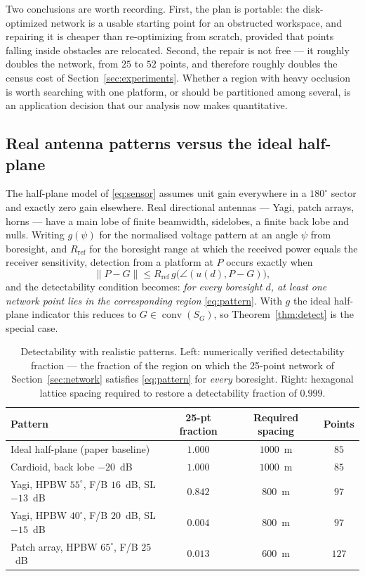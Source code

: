 \documentclass[preprint,12pt,3p]{elsarticle}
\theoremstyle{definition}
\newcommand{\conv}{\operatorname{conv}}
\begin{document}
Two conclusions are worth recording. First, the plan is portable: the disk-optimized network is a
usable starting point for an obstructed workspace, and repairing it is cheaper than re-optimizing
from scratch, provided that points falling inside obstacles are relocated. Second, the repair is
not free --- it roughly doubles the network, from $25$ to $52$ points, and therefore roughly
doubles the census cost of Section~\ref{sec:experiments}. Whether a region with heavy occlusion is
worth searching with one platform, or should be partitioned among several, is an application
decision that our analysis now makes quantitative.


\subsection{Real antenna patterns versus the ideal half-plane}
\label{sec:antenna}

The half-plane model of \eqref{eq:sensor} assumes unit gain everywhere in a $180^\circ$ sector and
exactly zero gain elsewhere. Real directional antennas --- Yagi, patch arrays, horns --- have a
main lobe of finite beamwidth, sidelobes, a finite back lobe and nulls. Writing $g(\psi)$ for the
normalised voltage pattern at an angle $\psi$ from boresight, and $R_{\mathrm{ref}}$ for the
boresight range at which the received power equals the receiver sensitivity, detection from a
platform at $P$ occurs exactly when
\begin{equation}
\|P-G\|\le R_{\mathrm{ref}}\,g\bigl(\angle(u(d),P-G)\bigr),
\label{eq:pattern}
\end{equation}
and the detectability condition becomes: \emph{for every boresight $d$, at least one network point
lies in the corresponding region} \eqref{eq:pattern}. With $g$ the ideal half-plane indicator this
reduces to $G\in\conv(S_G)$, so Theorem~\ref{thm:detect} is the special case.

\begin{table}[t]
\caption{Detectability with realistic patterns. Left: numerically verified detectability fraction
--- the fraction of the region on which the 25-point network of Section~\ref{sec:network}
satisfies \eqref{eq:pattern} for \emph{every} boresight. Right: hexagonal lattice spacing
required to restore a detectability fraction of $0.999$.}
\label{tab:antenna}
\centering
\small
\begin{tabular}{lccc}
\toprule
Pattern & 25-pt fraction & Required spacing & Points \\
\midrule
Ideal half-plane (paper baseline)        & $1.000$ & $1000$~m & $85$ \\
Cardioid, back lobe $-20$~dB             & $1.000$ & $1000$~m & $85$ \\
Yagi, HPBW $55^\circ$, F/B $16$~dB, SL $-13$~dB & $0.842$ & $800$~m & $97$ \\
Yagi, HPBW $40^\circ$, F/B $20$~dB, SL $-15$~dB & $0.004$ & $800$~m & $97$ \\
Patch array, HPBW $65^\circ$, F/B $25$~dB       & $0.013$ & $600$~m & $127$ \\
\bottomrule
\end{tabular}
\end{table}
\end{document}
